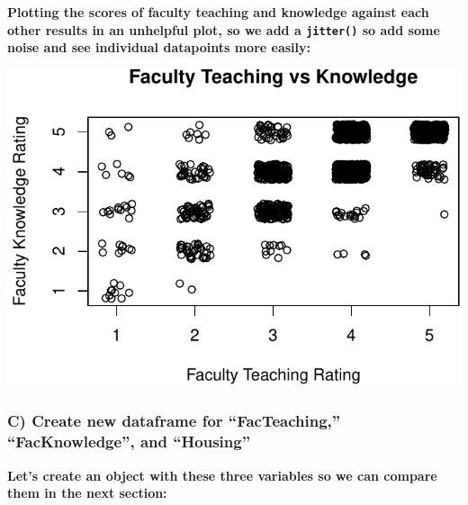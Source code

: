 \documentclass[
]{article}
\newenvironment{Shaded}{\begin{snugshade}}{\end{snugshade}}
\newcommand{\DataTypeTok}[1]{\textcolor[rgb]{0.13,0.29,0.53}{#1}}
\newcommand{\KeywordTok}[1]{\textcolor[rgb]{0.13,0.29,0.53}{\textbf{#1}}}
\newcommand{\NormalTok}[1]{#1}
\newcommand{\OperatorTok}[1]{\textcolor[rgb]{0.81,0.36,0.00}{\textbf{#1}}}
\newcommand{\StringTok}[1]{\textcolor[rgb]{0.31,0.60,0.02}{#1}}
\begin{document}
\textbf{Plotting the scores of faculty teaching and knowledge against
each other results in an unhelpful plot, so we add a \texttt{jitter()}
so add some noise and see individual datapoints more easily:}

\begin{Shaded}
\end{Shaded}

\begin{center}\includegraphics{2.0-Multivariate-Visualization-Assignment_files/figure-latex/unnamed-chunk-26-1} \end{center}

\hypertarget{c-create-new-dataframe-for-facteaching-facknowledge-and-housing}{%
\subsubsection{C) Create new dataframe for ``FacTeaching,''
``FacKnowledge'', and
``Housing''}\label{c-create-new-dataframe-for-facteaching-facknowledge-and-housing}}

\textbf{Let's create an object with these three variables so we can
compare them in the next section:}
\end{document}
